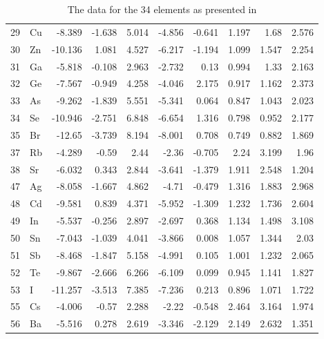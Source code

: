 \documentclass[11pt,oneside,czech,american]{book} %
\theoremstyle{definition} %
\theoremstyle{definition}
\begin{document}
\begin{table}[H]
\begin{tabular}{rlrrrrrrrr}
		29 & Cu     &  -8.389 & -1.638 &  5.014 &  -4.856 & -0.641 & 1.197 & 1.68  & 2.576 \\
		30 & Zn     & -10.136 &  1.081 &  4.527 &  -6.217 & -1.194 & 1.099 & 1.547 & 2.254 \\
		31 & Ga     &  -5.818 & -0.108 &  2.963 &  -2.732 &  0.13  & 0.994 & 1.33  & 2.163 \\
		32 & Ge     &  -7.567 & -0.949 &  4.258 &  -4.046 &  2.175 & 0.917 & 1.162 & 2.373 \\
		33 & As     &  -9.262 & -1.839 &  5.551 &  -5.341 &  0.064 & 0.847 & 1.043 & 2.023 \\
		34 & Se     & -10.946 & -2.751 &  6.848 &  -6.654 &  1.316 & 0.798 & 0.952 & 2.177 \\
		35 & Br     & -12.65  & -3.739 &  8.194 &  -8.001 &  0.708 & 0.749 & 0.882 & 1.869 \\
		37 & Rb     &  -4.289 & -0.59  &  2.44  &  -2.36  & -0.705 & 2.24  & 3.199 & 1.96  \\
		38 & Sr     &  -6.032 &  0.343 &  2.844 &  -3.641 & -1.379 & 1.911 & 2.548 & 1.204 \\
		47 & Ag     &  -8.058 & -1.667 &  4.862 &  -4.71  & -0.479 & 1.316 & 1.883 & 2.968 \\
		48 & Cd     &  -9.581 &  0.839 &  4.371 &  -5.952 & -1.309 & 1.232 & 1.736 & 2.604 \\
		49 & In     &  -5.537 & -0.256 &  2.897 &  -2.697 &  0.368 & 1.134 & 1.498 & 3.108 \\
		50 & Sn     &  -7.043 & -1.039 &  4.041 &  -3.866 &  0.008 & 1.057 & 1.344 & 2.03  \\
		51 & Sb     &  -8.468 & -1.847 &  5.158 &  -4.991 &  0.105 & 1.001 & 1.232 & 2.065 \\
		52 & Te     &  -9.867 & -2.666 &  6.266 &  -6.109 &  0.099 & 0.945 & 1.141 & 1.827 \\
		53 & I      & -11.257 & -3.513 &  7.385 &  -7.236 &  0.213 & 0.896 & 1.071 & 1.722 \\
		55 & Cs     &  -4.006 & -0.57  &  2.288 &  -2.22  & -0.548 & 2.464 & 3.164 & 1.974 \\
		56 & Ba     &  -5.516 &  0.278 &  2.619 &  -3.346 & -2.129 & 2.149 & 2.632 & 1.351 \\
		\hline
	\end{tabular}
\caption{The data for the 34 elements as presented in \parencite{ghiringhelli15_supplementary}}
\end{table}
\end{document}
